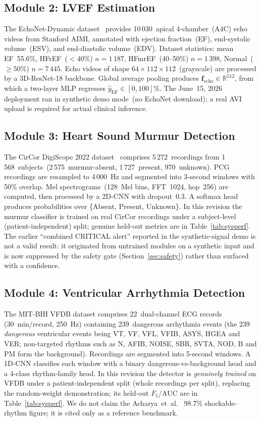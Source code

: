 \documentclass[AMA,STIX1COL,]{WileyNJD-v2}
\begin{document}
\subsection{Module 2: LVEF Estimation}

The EchoNet-Dynamic dataset~\cite{ouyang2020} provides 10\,030~apical
4-chamber~(A4C) echo videos from Stanford AIMI, annotated with
ejection fraction~(EF), end-systolic volume~(ESV), and end-diastolic
volume~(EDV). Dataset statistics: mean EF~55.6\%,
HFrEF~($<40\%$) $n=1\,187$, HFmrEF~(40--50\%) $n=1\,398$,
Normal~($\geq 50\%$) $n=7\,445$. Echo videos of shape
$64\times112\times112$~(grayscale) are processed by a 3D-ResNet-18
backbone. Global average pooling produces
$\mathbf{f}_{\text{echo}}\in\mathbb{R}^{512}$, from which a two-layer
MLP regresses $\hat{y}_{\text{EF}}\in[0,100]\%$. The June~15, 2026
deployment ran in synthetic demo mode~(no EchoNet download); a real
AVI upload is required for actual clinical inference.

\subsection{Module 3: Heart Sound Murmur Detection}

The CirCor DigiScope 2022 dataset~\cite{oliveira2022} comprises
5\,272~recordings from 1\,568~subjects~(2\,575~murmur-absent,
1\,727~present, 970~unknown). PCG recordings are resampled to
4\,000~Hz and segmented into 3-second windows with 50\% overlap.
Mel spectrograms~(128~Mel bins, FFT~1024, hop~256) are computed,
then processed by a 2D-CNN with dropout~0.3. A softmax head produces
probabilities over \{Absent, Present, Unknown\}. In this revision the
murmur classifier is trained on real CirCor recordings under a
subject-level (patient-independent) split; genuine held-out metrics are
in Table~\ref{tab:sysperf}. The earlier ``combined CRITICAL alert''
reported in the synthetic-signal demo is not a valid result: it
originated from untrained modules on a synthetic input and is now
suppressed by the safety gate (Section~\ref{sec:safety}) rather than
surfaced with a confidence.

\subsection{Module 4: Ventricular Arrhythmia Detection}

The MIT-BIH VFDB dataset comprises 22~dual-channel ECG records
(30~min/record, 250~Hz) containing 239~dangerous arrhythmia events
(the 239 \emph{dangerous} ventricular events being VT, VF, VFL, VFIB, ASYS,
HGEA and VER; non-targeted rhythms such as N, AFIB, NOISE, SBR, SVTA,
NOD, B and PM form the background). Recordings are segmented into
5-second windows. A 1D-CNN classifies each window with a binary
dangerous-vs-background head and a 4-class rhythm-family head. In this
revision the detector is \emph{genuinely trained} on VFDB under a
patient-independent split (whole recordings per split), replacing the
random-weight demonstration; its held-out $F_1$/AUC are in
Table~\ref{tab:sysperf}. We do not claim the Acharya~et~al.\
\cite{acharya2018} 98.7\% shockable-rhythm figure; it is cited only as
a reference benchmark.
\end{document}
